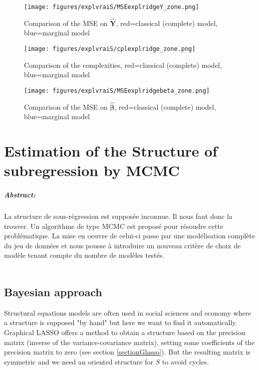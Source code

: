 \documentclass[12pt,a4paper]{report}
\begin{document}
\begin{figure}[h!]
	\centering
		  \texttt{[image: figures/explvraiS/MSEexplridgeY\_zone.png]}
		\caption{Comparison of the MSE on $\hat{\boldsymbol{Y}}$, red=classical (complete) model, blue=marginal model}\label{MSEexplridgeY_zone}
	\end{figure}
	\begin{figure}[h!]
	\centering
		  \texttt{[image: figures/explvraiS/cplexplridge\_zone.png]}
		\caption{Comparison of the complexities, red=classical (complete) model, blue=marginal model}\label{cplexplridge_zone}
	\end{figure}
	\begin{figure}[h!]
	\centering
		  \texttt{[image: figures/explvraiS/MSEexplridgebeta\_zone.png]}
		\caption{Comparison of the MSE on $\hat{\boldsymbol{\beta}}$, red=classical (complete) model, blue=marginal model}\label{MSEexplridgebeta_zone}
	\end{figure}
	\FloatBarrier

\chapter{Estimation of the Structure of subregression by MCMC}\label{chapterMCMC}
\paragraph{Abstract:} La structure de sous-régression est supposée inconnue. Il nous faut donc la trouver. Un algorithme de type MCMC est proposé pour résoudre cette problématique. La mise en oeuvre de celui-ci passe par une modélisation complète du jeu de données et nous pousse à introduire un nouveau critère de choix de modèle tenant compte du nombre de modèles testés.
\\
\\

\section{Bayesian approach}
Structural equations models are often used in social sciences and economy where a structure is supposed "by hand" but here we want to find it automatically. Graphical LASSO \cite{friedman2008sparse} offers a method to obtain a structure based on the precision matrix (inverse of the variance-covariance matrix), setting some coefficients of the precision matrix to zero (see section \ref{sectionGlasso}). But the resulting matrix is symmetric and we need an oriented structure for $S$ to avoid cycles.
\end{document}
